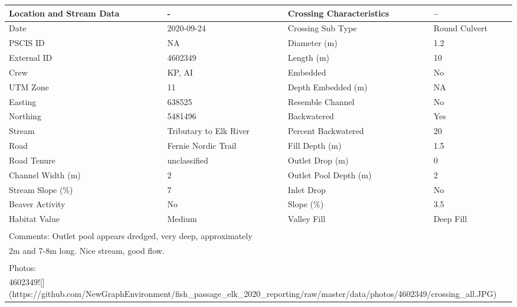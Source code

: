 \documentclass[
]{book}
\begin{document}
\begin{tabular}{l|l|l|l}
\hline
Location and Stream Data & - & Crossing Characteristics & --\\
\hline
Date & 2020-09-24 & Crossing Sub Type & Round Culvert\\
\hline
PSCIS ID & NA & Diameter (m) & 1.2\\
\hline
External ID & 4602349 & Length (m) & 10\\
\hline
Crew & KP, AI & Embedded & No\\
\hline
UTM Zone & 11 & Depth Embedded (m) & NA\\
\hline
Easting & 638525 & Resemble Channel & No\\
\hline
Northing & 5481496 & Backwatered & Yes\\
\hline
Stream & Tributary to Elk River & Percent Backwatered & 20\\
\hline
Road & Fernie Nordic Trail & Fill Depth (m) & 1.5\\
\hline
Road Tenure & unclassified & Outlet Drop (m) & 0\\
\hline
Channel Width (m) & 2 & Outlet Pool Depth (m) & 2\\
\hline
Stream Slope (\%) & 7 & Inlet Drop & No\\
\hline
Beaver Activity & No & Slope (\%) & 3.5\\
\hline
Habitat Value & Medium & Valley Fill & Deep Fill\\
\hline
\multicolumn{4}{l}{\textsuperscript{} Comments: Outlet pool appears dredged, very deep, approximately}\\
\multicolumn{4}{l}{2m and 7-8m long. Nice stream, good flow.}\\
\multicolumn{4}{l}{\textsuperscript{} Photos:}\\
\multicolumn{4}{l}{4602349![](https://github.com/NewGraphEnvironment/fish\_passage\_elk\_2020\_reporting/raw/master/data/photos/4602349/crossing\_all.JPG)}\\
\end{tabular}
\end{document}
